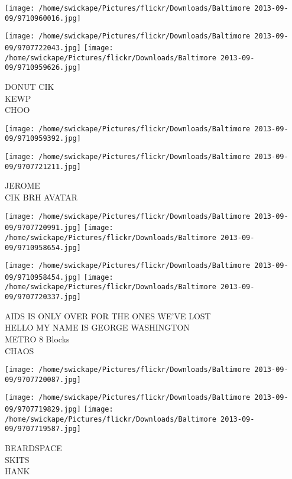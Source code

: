 \documentclass[10pt,letterpaper]{article}
\begin{document}
\texttt{[image: /home/swickape/Pictures/flickr/Downloads/Baltimore 2013-09-09/9710960016.jpg]}

\vspace{0.25in}
\texttt{[image: /home/swickape/Pictures/flickr/Downloads/Baltimore 2013-09-09/9707722043.jpg]}
\texttt{[image: /home/swickape/Pictures/flickr/Downloads/Baltimore 2013-09-09/9710959626.jpg]}

DONUT CIK\\
KEWP\\
CHOO\\
\pagebreak

\texttt{[image: /home/swickape/Pictures/flickr/Downloads/Baltimore 2013-09-09/9710959392.jpg]}

\vspace{0.25in}
\texttt{[image: /home/swickape/Pictures/flickr/Downloads/Baltimore 2013-09-09/9707721211.jpg]}

JEROME\\
CIK BRH AVATAR\\
\pagebreak

\texttt{[image: /home/swickape/Pictures/flickr/Downloads/Baltimore 2013-09-09/9707720991.jpg]}
\texttt{[image: /home/swickape/Pictures/flickr/Downloads/Baltimore 2013-09-09/9710958654.jpg]}

\texttt{[image: /home/swickape/Pictures/flickr/Downloads/Baltimore 2013-09-09/9710958454.jpg]}
\texttt{[image: /home/swickape/Pictures/flickr/Downloads/Baltimore 2013-09-09/9707720337.jpg]}

AIDS IS ONLY OVER FOR THE ONES WE'VE LOST\\
HELLO MY NAME IS GEORGE WASHINGTON\\
METRO 8 Blocks\\
CHAOS\\
\pagebreak

\texttt{[image: /home/swickape/Pictures/flickr/Downloads/Baltimore 2013-09-09/9707720087.jpg]}

\vspace{0.25in}
\texttt{[image: /home/swickape/Pictures/flickr/Downloads/Baltimore 2013-09-09/9707719829.jpg]}
\texttt{[image: /home/swickape/Pictures/flickr/Downloads/Baltimore 2013-09-09/9707719587.jpg]}

BEARDSPACE\\
SKITS\\
HANK\\
\pagebreak
\end{document}
